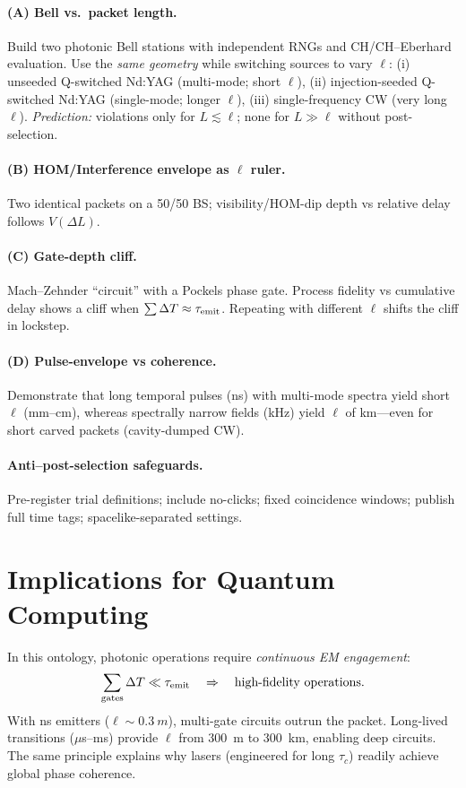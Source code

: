 \documentclass[reprint,aps,prl,nofootinbib,superscriptaddress]{revtex4-2}
\begin{document}
\paragraph*{(A) Bell vs.\ packet length.} Build two photonic Bell stations with independent RNGs and CH/CH--Eberhard evaluation. Use the \emph{same geometry} while switching sources to vary $\ell$: (i) unseeded Q-switched Nd:YAG (multi-mode; short $\ell$), (ii) injection-seeded Q-switched Nd:YAG (single-mode; longer $\ell$), (iii) single-frequency CW (very long $\ell$). \emph{Prediction:} violations only for $L \lesssim \ell$; none for $L \gg \ell$ without post-selection.

\paragraph*{(B) HOM/Interference envelope as $\ell$ ruler.} Two identical packets on a 50/50 BS; visibility/HOM-dip depth vs relative delay follows $V(\Delta L)$.

\paragraph*{(C) Gate-depth cliff.} Mach--Zehnder ``circuit'' with a Pockels phase gate. Process fidelity vs cumulative delay shows a cliff when $\sum \Delta T \approx \tau_{\rm emit}$. Repeating with different $\ell$ shifts the cliff in lockstep.

\paragraph*{(D) Pulse-envelope vs coherence.} Demonstrate that long temporal pulses (ns) with multi-mode spectra yield short $\ell$ (mm--cm), whereas spectrally narrow fields (kHz) yield $\ell$ of km---even for short carved packets (cavity-dumped CW).

\paragraph*{Anti--post-selection safeguards.} Pre-register trial definitions; include no-clicks; fixed coincidence windows; publish full time tags; spacelike-separated settings.

\section{Implications for Quantum Computing}
In this ontology, photonic operations require \emph{continuous EM engagement}:
\begin{equation}
\sum_{\rm gates} \Delta T \ll \tau_{\rm emit} \quad \Rightarrow \quad \text{high-fidelity operations}.
\end{equation}
With ns emitters ($\ell \sim \SI{0.3}{m}$), multi-gate circuits outrun the packet. Long-lived transitions ($\mu$s--ms) provide $\ell$ from \SI{300}{m} to \SI{300}{km}, enabling deep circuits. The same principle explains why lasers (engineered for long $\tau_c$) readily achieve global phase coherence.
\end{document}
